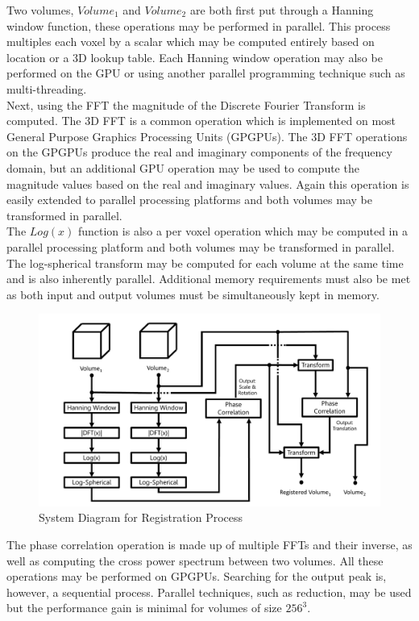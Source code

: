 Two volumes, $Volume_1$ and $Volume_2$ are both first put through a Hanning window function, these operations may be performed in parallel. This process multiples each voxel by a scalar which may be computed entirely based on location or a 3D lookup table. Each Hanning window operation may also be performed on the GPU or using another parallel programming technique such as multi-threading. \\

Next, using the FFT the magnitude of the Discrete Fourier Transform is computed. The 3D FFT is a common operation which is implemented on most General Purpose Graphics Processing Units (GPGPUs). The 3D FFT operations on the GPGPUs produce the real and imaginary components of the frequency domain, but an additional GPU operation may be used to compute the magnitude values based on the real and imaginary values. Again this operation is easily extended to parallel processing platforms and both volumes may be transformed in parallel. \\

The $Log(x)$ function is also a per voxel operation which may be computed in a parallel processing platform and both volumes may be transformed in parallel. The log-spherical transform may be computed for each volume at the same time and is also inherently parallel. Additional memory requirements must also be met as both input and output volumes must be simultaneously kept in memory. \\

\begin{figure}[!htb]
\centering
\includegraphics[width=5.0in]{images/ch2/pipeline2}
\caption{System Diagram for Registration Process}
\label{fig:PIPELINENo1}
\end{figure}


The phase correlation operation is made up of multiple FFTs and their inverse, as well as computing the cross power spectrum between two volumes. All these operations may be performed on GPGPUs. Searching for the output peak is, however, a sequential process. Parallel techniques, such as reduction, may be used but the performance gain is minimal for volumes of size $256^3$. \\

